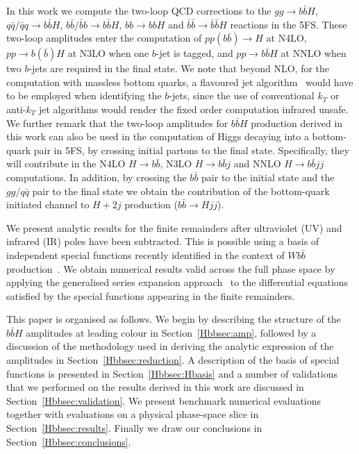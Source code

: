 \documentclass[main.tex]{subfiles}
\begin{document}
In this work we compute the two-loop QCD corrections to the $gg \rightarrow b\bar{b}H$,
$q\bar{q}/\bar{q}q \rightarrow b\bar{b}H$, $b\bar{b}/\bar{b}b\rightarrow b\bar{b}H$, $bb \rightarrow
bbH$ and $\bar{b}\bar{b}\rightarrow\bar{b}\bar{b}H$ reactions in the 5FS. These two-loop amplitudes
enter the computation of $pp(b\bar{b})\to H$ at N4LO, $pp\to b(\bar{b})H$ at N3LO when one $b$-jet
is tagged, and $pp\to b\bar{b}H$ at NNLO when two $b$-jets are required in the final state.  We note
that beyond NLO, for the computation with massless bottom quarks, a flavoured jet
algorithm~\cite{Banfi:2006hf} would have to be employed when identifying the $b$-jets, since the use
of conventional $k_T$ or anti-$k_T$ jet algorithms would render the fixed order computation infrared
unsafe.  We further remark that the two-loop amplitudes for $b\bar{b}H$ production derived in this
work can also be used in the computation of Higgs decaying into a bottom-quark pair in 5FS, by
crossing initial partons to the final state. Specifically, they will contribute in the N4LO $H\to
b\bar{b}$, N3LO $H\to b\bar{b}j$ and NNLO $H\to b\bar{b}jj$ computations.  In addition, by crossing
the $b\bar{b}$ pair to the initial state and the $gg/q\bar{q}$ pair to the final state we obtain the
contribution of the bottom-quark initiated channel to $H+2j$ production ($b\bar{b}\to Hjj$).

We present analytic results for the finite remainders after ultraviolet (UV) and infrared (IR) poles have been subtracted.
This is possible using a basis of independent special functions recently identified in the context
of $Wb\bar{b}$ production~\cite{Badger:2021nhg}. We obtain numerical results valid across the full phase
space by applying the generalised series expansion approach~\cite{Francesco:2019yqt,Abreu:2020jxa,Hidding:2020ytt} to
the differential equations satisfied by the special functions appearing in the finite remainders.

This paper is organised as follows. We begin by describing the structure of the $b\bar{b}H$
amplitudes at leading colour in Section~\ref{Hbbsec:amp}, followed by a discussion of the methodology
used in deriving the analytic expression of the amplitudes in Section~\ref{Hbbsec:reduction}. 
A description of the basis of special functions is presented in Section~\ref{Hbbsec:Hbasis} and a number of validations
that we performed on the results derived in this work are discussed in Section~\ref{Hbbsec:validation}.
We present benchmark numerical evaluations together with evaluations on a physical phase-space slice in
Section~\ref{Hbbsec:results}. Finally we draw our conclusions in Section~\ref{Hbbsec:conclusions}. 
\end{document}
